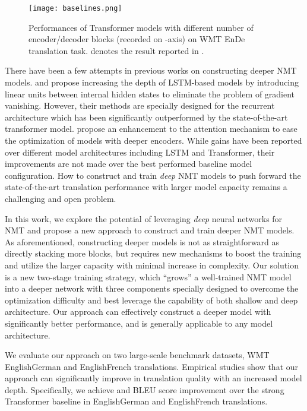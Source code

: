 \documentclass[11pt,a4paper]{article}
\begin{document}
\begin{figure}[!t]
\centering
\texttt{[image: baselines.png]}
\caption{Performances of Transformer models with different number of encoder/decoder blocks (recorded on -axis) on WMT EnDe translation task.  denotes the result reported in \cite{vaswani2017attention}.}
\label{fig:baselines}
\end{figure}

There have been a few attempts in previous works on constructing deeper NMT models. \citet{zhou2016deep} and \citet{wang2017deep} propose increasing the depth of LSTM-based models by introducing linear units between internal hidden states to eliminate the problem of gradient vanishing. However, their methods are specially designed for the recurrent architecture which has been significantly outperformed by the state-of-the-art transformer model. \citet{bapna2018training} propose an enhancement to the attention mechanism to ease the optimization of models with deeper encoders. While gains have been reported over different model architectures including LSTM and Transformer, their improvements are not made over the best performed baseline model configuration. How to construct and train {\em deep} NMT models to push forward the state-of-the-art translation performance with larger model capacity remains a challenging and open problem.

In this work, we explore the potential of leveraging {\em deep} neural networks for NMT and propose a new approach to construct and train deeper NMT models. As aforementioned, constructing deeper models is not as straightforward as directly stacking more blocks, but requires new mechanisms to boost the training and utilize the larger capacity with minimal increase in complexity. Our solution is a new two-stage training strategy, which ``grows'' a well-trained NMT model into a deeper network with three components specially designed to overcome the optimization difficulty and best leverage the capability of both shallow and deep architecture. Our approach can effectively construct a deeper model with significantly better performance, and is generally applicable to any model architecture.

We evaluate our approach on two  large-scale benchmark datasets, WMT EnglishGerman and EnglishFrench translations. Empirical studies show that our approach can significantly improve in translation quality with an increased model depth. Specifically, we achieve  and  BLEU score improvement over the strong Transformer baseline in EnglishGerman and EnglishFrench translations.
\end{document}
